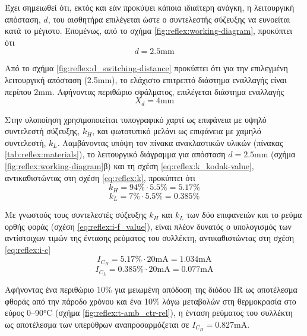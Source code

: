 Έχει σημειωθεί ότι, εκτός και εάν προκύψει κάποια ιδιαίτερη ανάγκη, η
λειτουργική
απόσταση, $d$, του αισθητήρα επιλέγεται ώστε ο συντελεστής σύζευξης να ευνοείται
κατά το μέγιστο. Επομένως, από το σχήμα \ref{fig:reflex:working-diagram},
προκύπτει ότι
\begin{equation}
d = 2.5 \text{mm}
\end{equation}

Από το σχήμα \ref{fig:reflex:d_switching-distance} προκύπτει ότι για την
επιλεγμένη λειτουργική απόσταση (2.5mm), το ελάχιστο επιτρεπτό διάστημα
εναλλαγής είναι περίπου 2mm. Αφήνοντας περιθώριο σφάλματος, επιλέγεται διάστημα
εναλλαγής
\begin{equation}
X_d = 4 \text{mm}
\end{equation}

Στην υλοποίηση χρησιμοποιείται τυπογραφικό χαρτί ως επιφάνεια με υψηλό
συντελεστή σύζευξης, $k_H$, και φωτοτυπικό μελάνι ως επιφάνεια με χαμηλό
συντελεστή, $k_L$.
Λαμβάνοντας υπόψη τον πίνακα ανακλαστικών υλικών
(πίνακας \ref{tab:reflex:materials}), το
λειτουργικό διάγραμμα για απόσταση $d = 2.5$mm
(σχήμα \ref{fig:reflex:working-diagram}β) και τη σχέση
\eqref{eq:reflex:k_kodak-value}, αντικαθιστώντας στη σχέση \eqref{eq:reflex:k},
προκύπτει ότι
\begin{equation}
k_H = 94 \% \cdot 5.5 \% = 5.17 \%
\end{equation}
\begin{equation}
k_L = 7 \% \cdot 5.5 \% = 0.385 \%
\end{equation}

Με γνωστούς τους συντελεστές σύζευξης $k_H$ και $k_L$ των δύο επιφανειών και το
ρεύμα ορθής φοράς (σχέση \eqref{eq:reflex:i-f_value}), είναι πλέον δυνατός ο
υπολογισμός των αντίστοιχων τιμών της έντασης ρεύματος του συλλέκτη,
αντικαθιστώντας στη σχέση \eqref{eq:reflex:i-c}
\begin{equation}
I_{C_H} = 5.17\% \cdot 20 \text{mA} = 1.034 \text{mA}
\end{equation}
\begin{equation}
I_{C_L} = 0.385\% \cdot 20 \text{mA} = 0.077 \text{mA}
\end{equation}

Αφήνοντας ένα περιθώριο 10\% για μειωμένη απόδοση της διόδου IR ως αποτέλεσμα
φθοράς από την πάροδο χρόνου και ένα 10\% λόγω μεταβολών στη θερμοκρασία
στο εύρος 0--90°C (σχήμα \ref{fig:reflex:t-amb_ctr-rel}), η ένταση ρεύματος του
συλλέκτη ως αποτέλεσμα των υπερύθρων αναπροσαρμόζεται σε $I_{C_H} = 0.827$mA.

